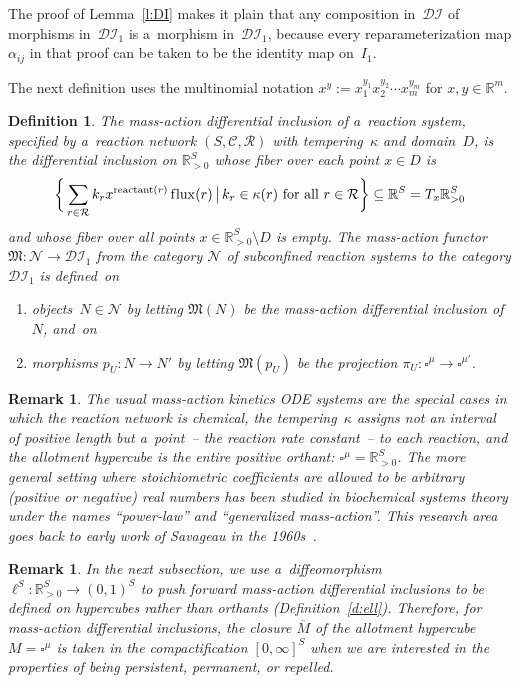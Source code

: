 \documentclass[pdftex]{sigma}
\newtheorem{Definition}[Theorem]{Definition}
\newtheorem{Remark}[Theorem]{Remark}
\newcommand{\source}[1]{\operatorname{reactant}(#1)}
\newcommand{\flux}[1]{\operatorname{f\/lux}(#1)} %
\newcommand\ol[1]{{\overline {#1}}}
\begin{document}
The proof of Lemma~\ref{l:DI} makes it plain that any composition in~$\mathcal{DI}$ of morphisms in~$\mathcal{DI}_1$ is
a~morphism in~$\mathcal{DI}_1$, because every reparameterization map $\alpha_{ij}$ in that proof can be taken to be the
identity map on~$I_1$.

The next def\/inition uses the multinomial notation $x^y:=x_1^{y_1}x_2^{y_2}\cdots x_m^{y_m}$ for $x,y\in\mathbb{R}^m$.
\begin{Definition}
\label{d:functor}
The \emph{mass-action differential inclusion} of a~reaction system, specif\/ied by a~reaction network $(S,\mathcal
C,\mathcal R)$ with tempering~$\kappa$ and domain~$D$, is the dif\/ferential inclusion on $\mathbb{R}_{>0}^S$ whose
f\/iber over each point $x\in D$ is
\begin{gather}
\label{eq:m-a}
\bigg\{\sum_{r\in\mathcal R}k_r x^{\source{r}}\flux{r}\,\big|\, k_r\in\kappa(r)~\text{for all}~r\in\mathcal R\bigg\}\subseteq\mathbb{R}^S=T_x\mathbb{R}_{>0}^S
\end{gather}
and whose f\/iber over all points $x\in\mathbb{R}_{>0}^S\setminus D$ is empty.
The \emph{mass-action functor} $\mathfrak M:\mathcal N\to\mathcal{DI}_1$ from the category $\mathcal N$ of
subconf\/ined reaction systems to the category $\mathcal{DI}_1$ is def\/ined~on
\begin{enumerate}\itemsep=0pt
\item[1)] objects~$N\in\mathcal N$ by letting $\mathfrak M(N)$ be the mass-action dif\/ferential inclusion of~$N$, and~on
\item[2)] morphisms $p_U:N\to N'$ by letting $\mathfrak M(p_U)$ be the projection $\pi_U:\square^\mu\to\square^{\mu'}$.
\end{enumerate}
\end{Definition}
\begin{Remark}
\label{r:usual}
The usual mass-action kinetics ODE systems are the special cases in which the reaction network is chemical, the
tempering~$\kappa$ assigns not an interval of positive length but a~point~-- the reaction rate constant~-- to each
reaction, and the allotment hypercube is the entire positive orthant: $\square^\mu=\mathbb{R}_{>0}^S$.
The more general setting where stoichiometric coef\/f\/icients are allowed to be arbitrary (positive or negative) real
numbers has been studied in biochemical systems theory under the names ``power-law'' and ``generalized mass-action''.
This research area goes back to early work of Savageau in the 1960s~\cite{Savageau}.
\end{Remark}
\begin{Remark}
\label{rmk:m-a_in_cpc}
In the next subsection, we use a~dif\/feomorphism $\ell^S:\mathbb{R}_{>0}^S\to(0,1)^S$ to push forward mass-action
dif\/ferential inclusions to be def\/ined on hypercubes rather than orthants (Def\/inition~\ref{d:ell}).
Therefore, for mass-action dif\/ferential inclusions, the closure $\ol M$ of the allotment hypercube $M=\square^{\mu}$
is taken in the compactif\/ication $[0,\infty]^{S}$ when we are interested in the properties of being persistent,
permanent, or repelled.
\end{Remark}
\end{document}
